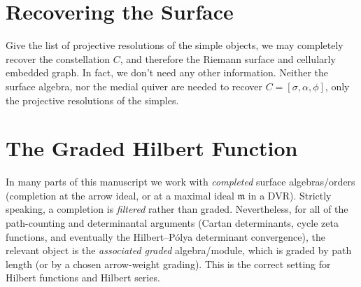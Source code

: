 \documentclass[11pt,oneside]{amsbook}
\numberwithin{equation}{section}
\theoremstyle{plain}
\theoremstyle{definition}
\newtheorem{ex}[theorem]{Example}
\theoremstyle{remark}
\DeclareMathOperator{\fm}{\mathfrak{m}}
\begin{document}
	
	
	
	
	
	\section{Recovering the Surface}
	Give the list of projective resolutions of the simple objects, we may completely recover the constellation $C$, and therefore the Riemann surface and cellularly embedded graph. In fact, we don't need any other information. Neither the surface algebra, nor the medial quiver are needed to recover $C = [\sigma, \alpha, \phi]$, only the projective resolutions of the simples. 
	
	
	
	
	\section{The Graded Hilbert Function}

\noindent
In many parts of this manuscript we work with \emph{completed} surface algebras/orders (completion at the arrow ideal, or at a maximal ideal $\mathfrak m$ in a DVR).
Strictly speaking, a completion is \emph{filtered} rather than graded.
Nevertheless, for all of the path-counting and determinantal arguments (Cartan determinants, cycle zeta functions, and eventually the Hilbert--Pólya determinant convergence),
the relevant object is the \emph{associated graded} algebra/module, which is graded by path length (or by a chosen arrow-weight grading).
This is the correct setting for Hilbert functions and Hilbert series.
\end{document}
